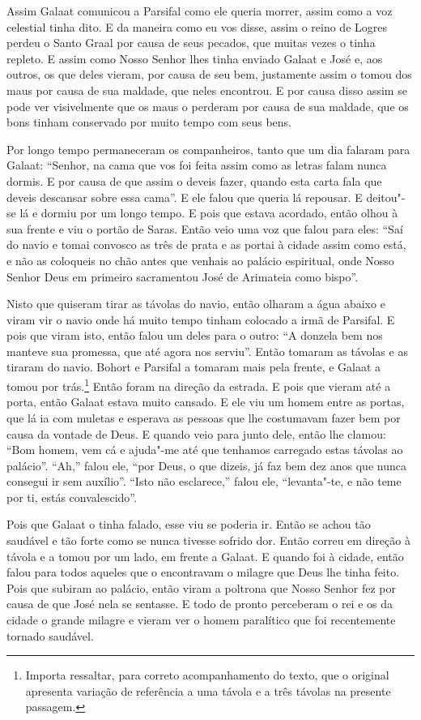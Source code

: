 Assim Galaat comunicou a Parsifal como ele queria morrer, assim como a voz
celestial tinha dito. E da maneira como eu vos disse, assim o reino de Logres
perdeu o Santo Graal por causa de seus pecados, que muitas vezes o tinha
repleto. E assim como Nosso Senhor lhes tinha enviado Galaat e
José e, aos outros, os que deles vieram, por causa de seu bem, justamente assim
o tomou dos maus por causa de sua maldade, que neles encontrou. E por causa
disso assim se pode ver visivelmente que os maus o perderam por causa de sua
maldade, que os bons tinham conservado por muito tempo com seus bens. 

Por longo tempo permaneceram os companheiros, tanto que um dia falaram para
Galaat: “Senhor, na cama que vos foi feita assim como as letras falam nunca
dormis. E por causa de que assim o deveis fazer, quando esta carta fala que
deveis descansar sobre essa cama”. E ele falou que queria lá repousar. E
deitou"-se lá e dormiu por um longo tempo. E pois que estava acordado, então
olhou à sua frente e viu o portão de Saras. Então veio uma voz que falou para
eles: “Saí do navio e tomai convosco as três de prata e as portai à cidade
assim como está, e não as coloqueis no chão antes que venhais ao palácio
espiritual, onde Nosso Senhor Deus em primeiro sacramentou José de Arimateia
como bispo”. 

Nisto que quiseram tirar as távolas do navio, então olharam a água abaixo e
viram vir o navio onde há muito tempo tinham colocado a irmã de Parsifal. E
pois que viram isto, então falou um deles para o outro: “A donzela bem nos
manteve sua promessa, que até agora nos serviu”. Então tomaram as
távolas e as tiraram do navio. Bohort e Parsifal a tomaram mais pela frente, e
Galaat a tomou por trás.\footnote{ Importa ressaltar, para correto
acompanhamento do texto, que o original apresenta variação de referência a uma
távola e a três távolas na presente passagem.} Então foram na
direção da estrada. E pois que vieram até a porta, então Galaat estava muito
cansado. E ele viu um homem entre as portas, que lá ia com muletas e esperava
as pessoas que lhe costumavam fazer bem por causa da vontade de Deus. E quando
veio para junto dele, então lhe clamou: “Bom homem, vem cá e ajuda"-me até que
tenhamos carregado estas távolas ao palácio”. “Ah,” falou ele, “por Deus, o que
dizeis, já faz bem dez anos que nunca consegui ir sem auxílio”. “Isto não
esclarece,” falou ele, “levanta"-te, e não teme por ti, estás convalescido”. 

Pois que Galaat o tinha falado, esse viu se poderia ir. Então se achou tão
saudável e tão forte como se nunca tivesse sofrido dor. Então correu em direção
à távola e a tomou por um lado, em frente a Galaat. E quando foi à cidade, então
falou para todos aqueles que o encontravam o milagre que Deus lhe tinha feito.
Pois que subiram ao palácio, então viram a poltrona que Nosso Senhor fez por
causa de que José nela se sentasse. E todo de pronto perceberam o rei
e os da cidade o grande milagre e vieram ver o homem paralítico que foi
recentemente tornado saudável.

